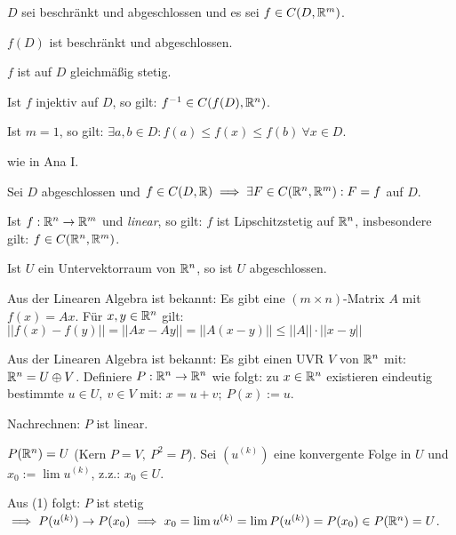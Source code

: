 \documentclass[a4paper,twoside,DIV15,BCOR12mm]{scrbook}
\begin{document}
\begin{satz}
$D$ sei beschränkt und abgeschlossen und es sei $f \in C(D,\mathbb{R}^m)$.
\begin{liste}
\item $f(D)$ ist beschränkt und abgeschlossen.
\item $f$ ist auf $D$ gleichmäßig stetig.
\item Ist $f$ injektiv auf $D$, so gilt: $f^{-1} \in C(f(D),\mathbb{R}^n)$.
\item Ist $m = 1$, so gilt: $\exists a,b \in D: f(a) \le f(x) \le f(b)\ \forall x \in D$.
\end{liste}
\end{satz}

\begin{beweis}
wie in Ana I.
\end{beweis}

\begin{satz}
Sei $D$ abgeschlossen und $f \in C(D,\mathbb{R}) \implies \exists F \in C(\mathbb{R}^n,\mathbb{R}^m): F=f$ auf $D$.
\end{satz}

\begin{satz}
\begin{liste}
\item Ist $f:\mathbb{R}^n \to \mathbb{R}^m$ und \emph{linear}, so gilt: $f$ ist Lipschitzstetig auf $\mathbb{R}^n$, insbesondere gilt: $f \in C(\mathbb{R}^n,\mathbb{R}^m)$.
\item Ist $U$ ein Untervektorraum von $\mathbb{R}^n$, so ist $U$ abgeschlossen.
\end{liste}
\end{satz}

\begin{beweise}
\item Aus der Linearen Algebra ist bekannt: Es gibt eine $(m \times n)$-Matrix $A$ mit $f(x) = Ax$. Für $x,y \in \mathbb{R}^n$ gilt: $||f(x)-f(y)|| = ||Ax - Ay|| = ||A(x-y)|| \le ||A||\cdot ||x-y||$

\item Aus der Linearen Algebra ist bekannt: Es gibt einen UVR $V$ von $\mathbb{R}^n$ mit: $\mathbb{R}^n = U \oplus V$. Definiere $P: \mathbb{R}^n \to \mathbb{R}^n$ wie folgt: zu $x \in \mathbb{R}^n$ existieren eindeutig bestimmte $u \in U,\ v \in V$ mit: $x = u+v;\ P(x) := u$.

Nachrechnen: $P$ ist linear.

$P(\mathbb{R}^n) = U$ (Kern $P = V,\ P^2 = P$). Sei $(u^{(k)})$ eine konvergente Folge in $U$ und $x_0 := \lim u^{(k)}$, z.z.: $x_0 \in U$.

Aus (1) folgt: $P$ ist stetig $\implies P(u^{(k)}) \to P(x_0) \implies x_0 = \lim u^{(k)} = \lim P(u^{(k)}) = P(x_0) \in P(\mathbb{R}^n) = U$.
\end{beweise}
\end{document}
